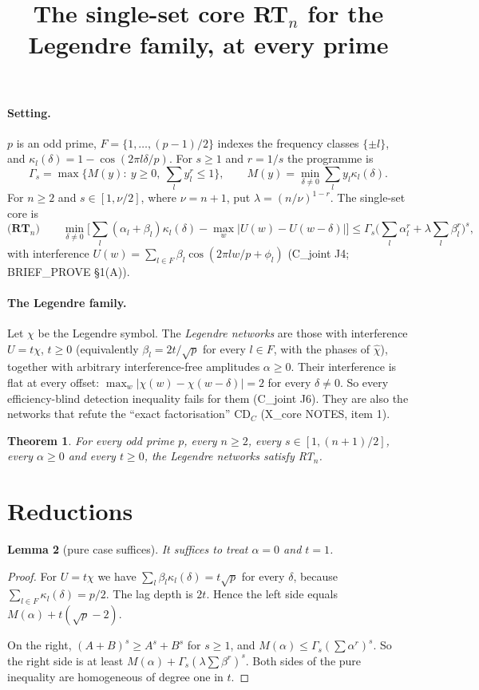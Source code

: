 \documentclass[11pt]{article}
\title{The single-set core RT$_n$ for the Legendre family, at every prime}
\date{}
\newtheorem{theorem}{Theorem}
\newtheorem{lemma}[theorem]{Lemma}
\theoremstyle{remark}\newtheorem{remark}[theorem]{Remark}
\begin{document}
\maketitle

\paragraph{Setting.}
$p$ is an odd prime, $F=\{1,\dots,(p-1)/2\}$ indexes the frequency classes $\{\pm l\}$, and
$\kappa_l(\delta)=1-\cos(2\pi l\delta/p)$. For $s\ge1$ and $r=1/s$ the programme is
\[\Gamma_s=\max\Big\{M(y):\ y\ge0,\ \textstyle\sum_l y_l^r\le1\Big\},\qquad M(y)=\min_{\delta\ne0}\sum_l y_l\kappa_l(\delta).\]
For $n\ge2$ and $s\in[1,\nu/2]$, where $\nu=n+1$, put $\lambda=(n/\nu)^{1-r}$. The single-set core is
\[\textbf{(RT$_n$)}\qquad \min_{\delta\ne0}\Big[\sum_l(\alpha_l+\beta_l)\kappa_l(\delta)-\max_w\big|U(w)-U(w-\delta)\big|\Big]\le
\Gamma_s\Big(\sum_l\alpha_l^r+\lambda\sum_l\beta_l^r\Big)^s,\]
with interference $U(w)=\sum_{l\in F}\beta_l\cos(2\pi lw/p+\phi_l)$ (C\_joint J4; BRIEF\_PROVE \S1(A)).

\paragraph{The Legendre family.}
Let $\chi$ be the Legendre symbol. The \emph{Legendre networks} are those with interference $U=t\chi$, $t\ge0$
(equivalently $\beta_l=2t/\sqrt p$ for every $l\in F$, with the phases of $\hat\chi$), together with arbitrary
interference-free amplitudes $\alpha\ge0$. Their interference is flat at every offset: $\max_w|\chi(w)-\chi(w-\delta)|=2$
for every $\delta\ne0$. So every efficiency-blind detection inequality fails for them (C\_joint J6). They are also the
networks that refute the ``exact factorisation'' CD$_C$ (X\_core NOTES, item 1).

\begin{theorem}\label{thm:main}
For every odd prime $p$, every $n\ge2$, every $s\in[1,(n+1)/2]$, every $\alpha\ge0$ and every $t\ge0$, the Legendre
networks satisfy RT$_n$.
\end{theorem}

\section{Reductions}

\begin{lemma}[pure case suffices]
It suffices to treat $\alpha=0$ and $t=1$.
\end{lemma}
\begin{proof}
For $U=t\chi$ we have $\sum_l\beta_l\kappa_l(\delta)=t\sqrt p$ for every $\delta$, because
$\sum_{l\in F}\kappa_l(\delta)=p/2$. The lag depth is $2t$. Hence the left side equals $M(\alpha)+t(\sqrt p-2)$.

On the right, $(A+B)^s\ge A^s+B^s$ for $s\ge1$, and $M(\alpha)\le\Gamma_s(\sum\alpha^r)^s$. So the right side is at least
$M(\alpha)+\Gamma_s(\lambda\sum\beta^r)^s$. Both sides of the pure inequality are homogeneous of degree one in $t$.
\end{proof}
\end{document}
